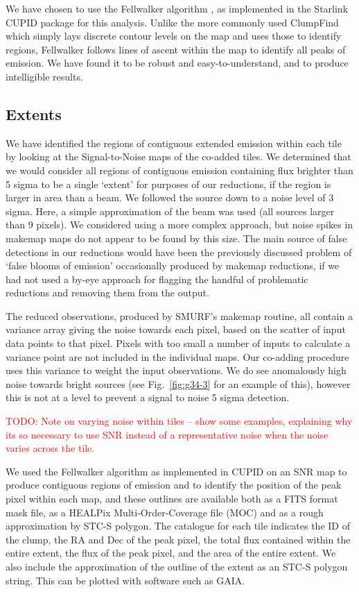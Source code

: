 \documentclass[twocolumn]{aastex6}
\newcommand{\todo}[1]{\textcolor{red}{TODO: #1}}
\begin{document}
We have chosen to use the Fellwalker algorithm \citep{Berry2015}, as
implemented in the Starlink CUPID \citep{cupid} package for this
analysis. Unlike the more commonly used ClumpFind which simply lays
discrete contour levels on the map and uses those to identify regions,
Fellwalker follows lines of ascent within the map to identify all
peaks of emission. We have found it to be robust and
easy-to-understand, and to produce intelligible results.

\subsection{Extents}

We have identified the regions of contiguous extended emission within
each tile by looking at the Signal-to-Noise maps of the co-added
tiles. We determined that we would consider all regions of contiguous
emission containing flux brighter than 5 sigma to be a single `extent'
for purposes of our reductions, if the region is larger in area than a
beam. We followed the source down to a noise level of 3 sigma.  Here,
a simple approximation of the beam was used (all sources larger than 9
pixels). We considered using a more complex approach, but noise spikes
in makemap maps do not appear to be found by this size. The main
source of false detections in our reductions would have been the
previously discussed problem of `false blooms of emission'
occasionally produced by makemap reductions, if we had not used a
by-eye approach for flagging the handful of problematic reductions and
removing them from the output.

The reduced observations, produced by SMURF's makemap routine, all
contain a variance array giving the noise towards each pixel, based on
the scatter of input data points to that pixel. Pixels with too small
a number of inputs to calculate a variance point are not included in
the individual maps. Our co-adding procedure uses this variance to
weight the input observations. We do see anomalously high noise
towards bright sources (see Fig.~\ref{fig:g34-3} for an
example of this), however this is not at a level to prevent a signal
to noise 5 sigma detection.

\todo{Note on varying noise within tiles -- show some examples,
  explaining why its so necessary to use SNR instead of a
  representative noise when the noise varies across the tile.}

We used the Fellwalker algorithm as implemented in CUPID on an SNR map
to produce contiguous regions of emission and to identify the position
of the peak pixel within each map, and these outlines are available
both as a FITS format mask file, as a HEALPix Multi-Order-Coverage
file (MOC) and as a rough approximation by STC-S polygon. The
catalogue for each tile indicates the ID of the clump, the RA and Dec
of the peak pixel, the total flux contained within the entire extent,
the flux of the peak pixel, and the area of the entire extent. We also
include the approximation of the outline of the extent as an STC-S
polygon string. This can be plotted with software such as GAIA.
\end{document}

